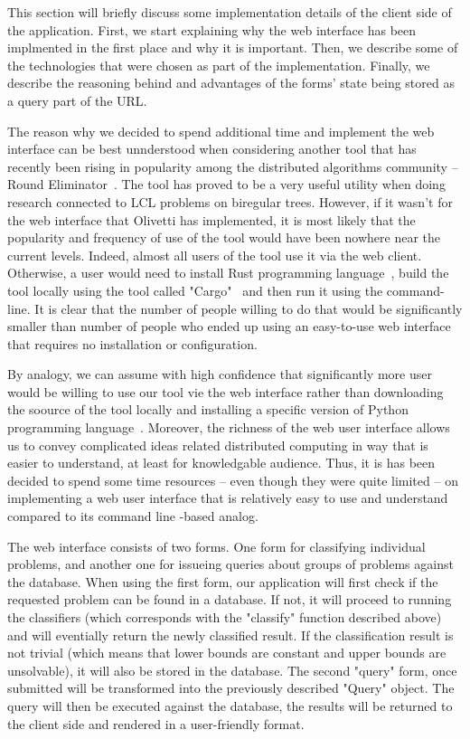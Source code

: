This section will briefly discuss some implementation details of
the client side of the application. First, we start explaining why
the web interface has been implmented in the first place and why it
is important. Then, we describe some of the technologies that were
chosen as part of the implementation. Finally, we describe the
reasoning behind and advantages of the forms' state being stored
as a query part of the URL.

The reason why we decided to spend additional time and implement
the web interface can be best unnderstood when considering
another tool that has recently been rising in popularity among
the distributed algorithms community -- Round Eliminator~\cite{Olivetti2020}. The tool has proved to be a very useful utility
when doing research connected to LCL problems on biregular trees.
However, if it wasn't for the web interface that Olivetti has
implemented, it is most likely that the popularity and
frequency of use of the tool would have been nowhere near the current
levels. Indeed, almost all users of the tool use it via the web
client. Otherwise, a user would need to install Rust programming
language~\cite{Rust}, build the tool locally using the tool
called "Cargo"~\cite{Cargo} and then run it using the command-line.
It is clear that the number of people willing to do that would be
significantly smaller than number of people who ended up using
an easy-to-use web interface that requires no installation or 
configuration.

By analogy, we can assume with high confidence that significantly more
user would be willing to use our tool vie the web interface rather
than downloading the soource of the tool locally and installing
a specific version of Python programming language~\cite{CPython}.
Moreover, the richness of the web user interface allows us to convey complicated
ideas related distributed computing in way that is easier to understand, at least for knowledgable audience. Thus, it is has been
decided to spend some time resources -- even though they were 
quite limited -- on implementing a web user interface that is
relatively easy to use and understand compared to its
command line -based analog.

The web interface consists of two forms. One form for classifying
individual problems, and another one for issueing queries
about groups of problems against the database. When using the
first form, our application will first check if the requested
problem can be found in a database. If not, it will proceed to
running the classifiers (which corresponds with the "classify" function described above) and will eventially return the newly
classified result. If the classification result is not trivial (which means that lower bounds are constant and upper bounds are unsolvable),
it will also be stored in the database. The second "query" form, once
submitted will be transformed into the previously described
"Query" object. The query will then be executed against the database,
the results will be returned to the client side and rendered
in a user-friendly format.

